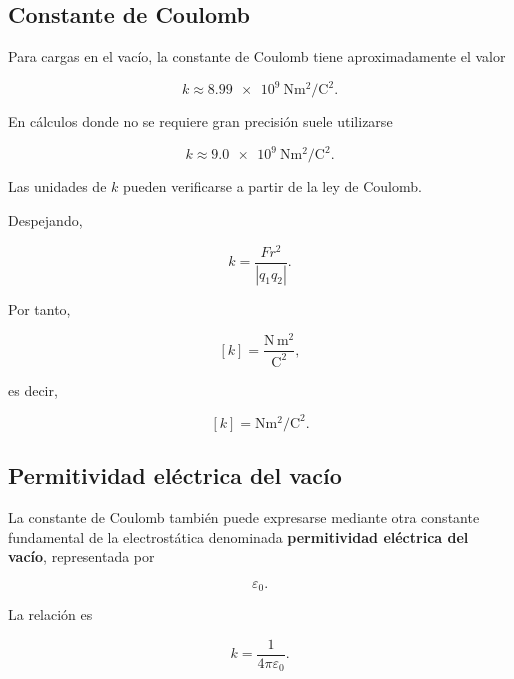 
\subsection{Constante de Coulomb}

Para cargas en el vacío, la constante de Coulomb tiene aproximadamente el
valor

\begin{equation}
    \boxed{
    k
    \approx
    \SI{8.99e9}{\newton\metre\squared\per\coulomb\squared}
    }.
    \label{eq:constante_coulomb}
\end{equation}

En cálculos donde no se requiere gran precisión suele utilizarse

\[
\boxed{
k
\approx
\SI{9.0e9}{\newton\metre\squared\per\coulomb\squared}
}.
\]

Las unidades de \(k\) pueden verificarse a partir de la ley de Coulomb.

Despejando,

\[
k
=
\frac{Fr^2}{|q_1q_2|}.
\]

Por tanto,

\[
[k]
=
\frac{\si{\newton}\,\si{\metre\squared}}
{\si{\coulomb\squared}},
\]

es decir,

\[
\boxed{
[k]
=
\si{\newton\metre\squared\per\coulomb\squared}
}.
\]



\subsection{Permitividad eléctrica del vacío}

La constante de Coulomb también puede expresarse mediante otra constante
fundamental de la electrostática denominada
\textbf{permitividad eléctrica del vacío}, representada por

\[
\varepsilon_0.
\]

La relación es

\begin{equation}
    \boxed{
    k
    =
    \frac{1}{4\pi\varepsilon_0}
    }.
    \label{eq:k_epsilon_0}
\end{equation}

